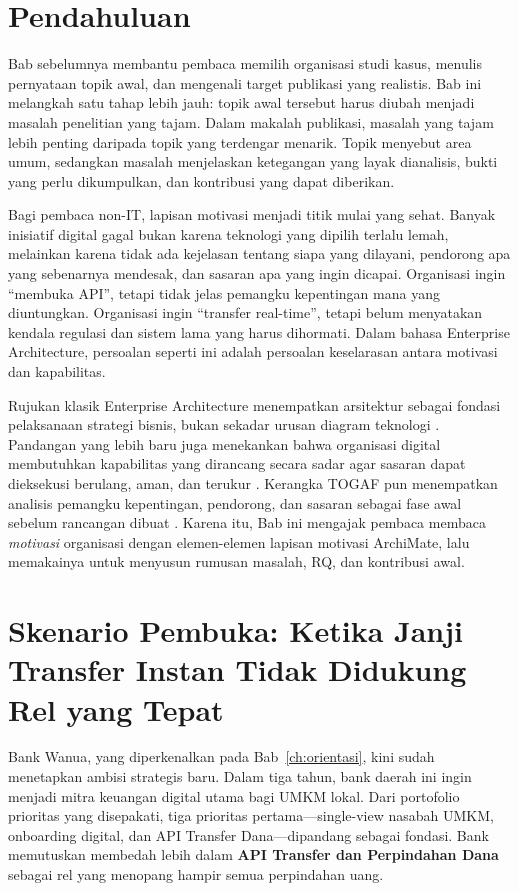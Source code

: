 \section{Pendahuluan}

Bab sebelumnya membantu pembaca memilih organisasi studi kasus, menulis
pernyataan topik awal, dan mengenali target publikasi yang realistis. Bab ini
melangkah satu tahap lebih jauh: topik awal tersebut harus diubah menjadi
masalah penelitian yang tajam. Dalam makalah publikasi, masalah yang tajam
lebih penting daripada topik yang terdengar menarik. Topik menyebut area umum,
sedangkan masalah menjelaskan ketegangan yang layak dianalisis, bukti yang
perlu dikumpulkan, dan kontribusi yang dapat diberikan.

Bagi pembaca non-IT, lapisan motivasi menjadi titik mulai yang sehat. Banyak
inisiatif digital gagal bukan karena teknologi yang dipilih terlalu lemah,
melainkan karena tidak ada kejelasan tentang siapa yang dilayani, pendorong apa
yang sebenarnya mendesak, dan sasaran apa yang ingin dicapai. Organisasi ingin
``membuka API'', tetapi tidak jelas pemangku kepentingan mana yang diuntungkan.
Organisasi ingin ``transfer real-time'', tetapi belum menyatakan kendala
regulasi dan sistem lama yang harus dihormati. Dalam bahasa Enterprise
Architecture, persoalan seperti ini adalah persoalan keselarasan antara
motivasi dan kapabilitas.

Rujukan klasik Enterprise Architecture menempatkan arsitektur sebagai fondasi
pelaksanaan strategi bisnis, bukan sekadar urusan diagram teknologi
\cite{ross2006enterprise}. Pandangan yang lebih baru juga menekankan bahwa
organisasi digital membutuhkan kapabilitas yang dirancang secara sadar agar
sasaran dapat dieksekusi berulang, aman, dan terukur \cite{ross2019designed}.
Kerangka TOGAF pun menempatkan analisis pemangku kepentingan, pendorong, dan
sasaran sebagai fase awal sebelum rancangan dibuat \cite{togaf10}. Karena itu,
Bab ini mengajak pembaca membaca \emph{motivasi} organisasi dengan elemen-elemen
lapisan motivasi ArchiMate, lalu memakainya untuk menyusun rumusan masalah, RQ,
dan kontribusi awal.

\section[Skenario Pembuka: Janji Transfer Instan dan Rel yang Tepat]{Skenario
Pembuka: Ketika Janji Transfer Instan Tidak Didukung Rel yang Tepat}

Bank Wanua, yang diperkenalkan pada Bab~\ref{ch:orientasi}, kini sudah
menetapkan ambisi strategis baru. Dalam tiga tahun, bank daerah ini ingin
menjadi mitra keuangan digital utama bagi UMKM lokal. Dari portofolio prioritas
yang disepakati, tiga prioritas pertama---single-view nasabah UMKM, onboarding
digital, dan API Transfer Dana---dipandang sebagai fondasi. Bank memutuskan
membedah lebih dalam \textbf{API Transfer dan Perpindahan Dana} sebagai rel yang
menopang hampir semua perpindahan uang.

